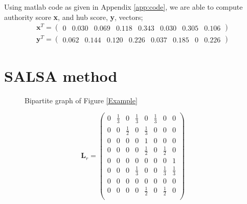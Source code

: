 \documentclass[11pt]{report}
\begin{document}
Using matlab code as given in Appendix \ref{app:code}, we are able to compute authority score \textbf{x}, and hub score, \textbf{y}, vectors;
\begin{eqnarray}
\textbf{x}^T = \left( \begin{array} {cccccccc}
0 & 0.030 & 0.069 & 0.118 & 0.343 &0.030 &0.305 &0.106
\end{array}\right) \\
\textbf{y}^T = \left( \begin{array} {cccccccc}
0.062 & 0.144 & 0.120 & 0.226 & 0.037 & 0.185 & 0 & 0.226
\end{array}\right)
\end{eqnarray}
\section{SALSA method}
\begin{figure}[H]
\centering
{}\caption{Bipartite graph of Figure \ref{Example} } \label{bipartite}
\end{figure}

\begin{equation}
\textbf{L}_r=\left(
\begin{array}{cccccccc}
0 & \frac{1}{3} & 0 & \frac{1}{3} & 0 & \frac{1}{3} & 0 & 0 \\
0 & 0 & \frac{1}{2} & 0 & \frac{1}{3} & 0 & 0 & 0 \\
0 & 0 & 0 & 0 & 1 & 0 & 0 & 0\\
0 & 0 & 0 & 0 & \frac{1}{2} & 0 & \frac{1}{2} & 0 \\
0 & 0 & 0 & 0 & 0 & 0 & 0 & 1 \\
0 & 0 & 0 & \frac{1}{3} & 0 & 0 & \frac{1}{3} & \frac{1}{3} \\
0 & 0 & 0 & 0 & 0 & 0 & 0 & 0 \\
0 & 0 & 0 & 0 & \frac{1}{2} & 0 & \frac{1}{2} & 0 \\
\end{array}
\right)
\end{equation} 
\end{document}
